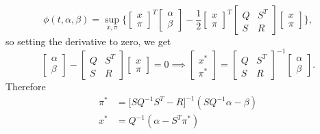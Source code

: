 \begin{equation*}
    \phi(t, \alpha, \beta) = \sup_{x, \pi} \bigg\{
    \begin{bmatrix}
        x\\
        \pi
    \end{bmatrix}^T
    \begin{bmatrix}
        \alpha\\
        \beta
    \end{bmatrix} - \frac12
    \begin{bmatrix}
        x\\
        \pi
    \end{bmatrix}^T
    \begin{bmatrix}
        Q & S^T\\
        S & R
    \end{bmatrix}
    \begin{bmatrix}
        x\\
        \pi
    \end{bmatrix}
    \bigg\},
\end{equation*}
so setting the derivative to zero, we get
\begin{equation*}
    \begin{bmatrix}
        \alpha\\
        \beta
    \end{bmatrix} - 
    \begin{bmatrix}
        Q & S^T\\
        S & R
    \end{bmatrix}
    \begin{bmatrix}
        x\\
        \pi
    \end{bmatrix}
    = 0 \implies 
    \begin{bmatrix}
        x^\ast\\
        \pi^\ast
    \end{bmatrix} = 
    \begin{bmatrix}
        Q & S^T\\
        S & R
    \end{bmatrix}^{-1}
    \begin{bmatrix}
        \alpha\\
        \beta
    \end{bmatrix}.
\end{equation*}
Therefore
\begin{align*}
    \pi^\ast &= \big[ S Q^{-1}S^T - R \big]^{-1}(S Q^{-1} \alpha - \beta)\\
    x^\ast &= Q^{-1} (\alpha - S^T \pi^\ast)
\end{align*}
